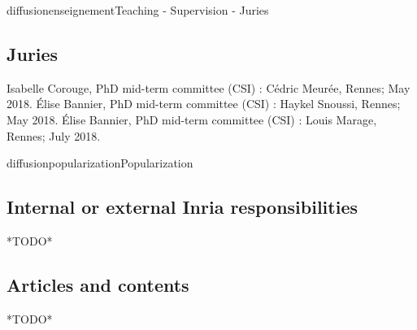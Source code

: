 \documentclass{ra2018}
\begin{document}
\begin{module}{diffusion}{enseignement}{Teaching - Supervision - Juries}
\subsection {Juries}
\begin{itemize}
    Isabelle Corouge, PhD mid-term committee (CSI) : Cédric Meurée, Rennes; May 2018.
    Élise Bannier, PhD mid-term committee (CSI) : Haykel Snoussi, Rennes; May 2018.
    Élise Bannier, PhD mid-term committee (CSI) : Louis Marage, Rennes; July 2018.
\end{itemize}


\end{module}

\begin{module}{diffusion}{popularization}{Popularization}



\subsection{Internal or external Inria responsibilities}
*TODO*

\subsection{Articles and contents}
*TODO*



\end{module}
\end{document}
